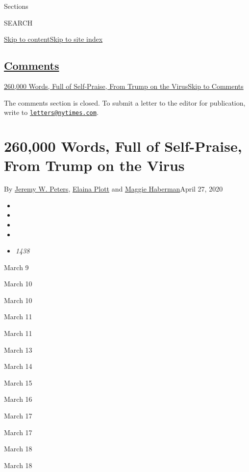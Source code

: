 Sections

SEARCH

\protect\hyperlink{site-content}{Skip to
content}\protect\hyperlink{site-index}{Skip to site index}

\hypertarget{comments}{%
\subsection{\texorpdfstring{\protect\hyperlink{commentsContainer}{Comments}}{Comments}}\label{comments}}

\href{}{260,000 Words, Full of Self-Praise, From Trump on the
Virus}\href{}{Skip to Comments}

The comments section is closed. To submit a letter to the editor for
publication, write to
\href{mailto:letters@nytimes.com}{\nolinkurl{letters@nytimes.com}}.

\hypertarget{260000-words-full-of-self-praise-from-trump-on-the-virus}{%
\section{260,000 Words, Full of Self-Praise, From Trump on the
Virus}\label{260000-words-full-of-self-praise-from-trump-on-the-virus}}

By \href{https://www.nytimes.com/by/jeremy-w-peters}{Jeremy W. Peters},
\href{https://www.nytimes.com/by/elaina-plott}{Elaina Plott} and
\href{https://www.nytimes.com/by/maggie-haberman}{Maggie Haberman}April
27, 2020

\begin{itemize}
\item
\item
\item
\item
\item
  \emph{1438}
\end{itemize}

March 9

March 10

March 10

March 11

March 11

March 13

March 14

March 15

March 16

March 17

March 17

March 18

March 18

